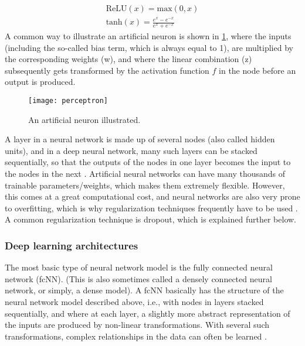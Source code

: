 \begin{gather}
    \text{ReLU}(x) = \text{max}(0,x) \label{eq:relu} \\[1ex]
    \text{tanh}(x) = \frac{e^x - e^{-x}}{e^x + e^{-x}} \label{eq:tanh}
\end{gather}
\noindent
A common way to illustrate an artificial neuron is shown in \cref{fig:perceptron}, where the inputs (including the so-called bias term, which is always equal to 1), are multiplied by the corresponding weights (w), and where the linear combination (z) subsequently gets transformed by the activation function $f$ in the node before an output is produced.
\begin{figure}[h]
\begin{center}
\texttt{[image: perceptron]}
\caption{An artificial neuron illustrated.}
\label{fig:perceptron}
\end{center}
\end{figure}

A layer in a neural network is made up of several nodes (also called hidden units), and in a deep neural network, many such layers can be stacked sequentially, so that the outputs of the nodes in one layer becomes the input to the nodes in the next \cite{smlbook}. Artificial neural networks can have many thousands of trainable parameters/weights, which makes them extremely flexible. However, this comes at a great computational cost, and neural networks are also very prone to overfitting, which is why regularization techniques frequently have to be used \cite{smlbook}. A common regularization technique is dropout, which is explained further below. 

\subsubsection{Deep learning architectures}
\label{sec:DL models}
The most basic type of neural network model is the fully connected neural network (fcNN). (This is also sometimes called a densely connected neural network, or simply, a dense model). A fcNN basically has the structure of the neural network model described above, i.e., with nodes in layers stacked sequentially, and where at each layer, a slightly more abstract representation of the inputs are produced by non-linear transformations. With several such transformations, complex relationships in the data can often be learned \cite{LeCun2015, smlbook}.


